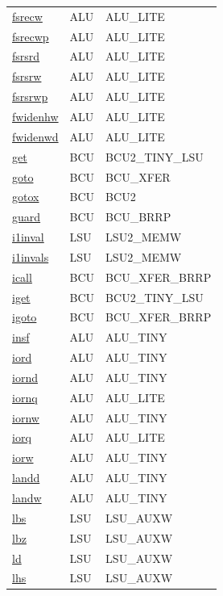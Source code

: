 \begin{small}
\begin{longtable}[l]{l l l}
\hyperlink{lvx.fsrecw}{fsrecw} & ALU & ALU\_LITE \\ 
\hyperlink{lvx.fsrecwp}{fsrecwp} & ALU & ALU\_LITE \\ 
\hyperlink{lvx.fsrsrd}{fsrsrd} & ALU & ALU\_LITE \\ 
\hyperlink{lvx.fsrsrw}{fsrsrw} & ALU & ALU\_LITE \\ 
\hyperlink{lvx.fsrsrwp}{fsrsrwp} & ALU & ALU\_LITE \\ 
\hyperlink{lvx.fwidenhw}{fwidenhw} & ALU & ALU\_LITE \\ 
\hyperlink{lvx.fwidenwd}{fwidenwd} & ALU & ALU\_LITE \\ 
\hyperlink{lvx.get}{get} & BCU & BCU2\_TINY\_LSU \\ 
\hyperlink{lvx.goto}{goto} & BCU & BCU\_XFER \\ 
\hyperlink{lvx.gotox}{gotox} & BCU & BCU2 \\ 
\hyperlink{lvx.guard}{guard} & BCU & BCU\_BRRP \\ 
\hyperlink{lvx.i1inval}{i1inval} & LSU & LSU2\_MEMW \\ 
\hyperlink{lvx.i1invals}{i1invals} & LSU & LSU2\_MEMW \\ 
\hyperlink{lvx.icall}{icall} & BCU & BCU\_XFER\_BRRP \\ 
\hyperlink{lvx.iget}{iget} & BCU & BCU2\_TINY\_LSU \\ 
\hyperlink{lvx.igoto}{igoto} & BCU & BCU\_XFER\_BRRP \\ 
\hyperlink{lvx.insf}{insf} & ALU & ALU\_TINY \\ 
\hyperlink{lvx.iord}{iord} & ALU & ALU\_TINY \\ 
\hyperlink{lvx.iornd}{iornd} & ALU & ALU\_TINY \\ 
\hyperlink{lvx.iornq}{iornq} & ALU & ALU\_LITE \\ 
\hyperlink{lvx.iornw}{iornw} & ALU & ALU\_TINY \\ 
\hyperlink{lvx.iorq}{iorq} & ALU & ALU\_LITE \\ 
\hyperlink{lvx.iorw}{iorw} & ALU & ALU\_TINY \\ 
\hyperlink{lvx.landd}{landd} & ALU & ALU\_TINY \\ 
\hyperlink{lvx.landw}{landw} & ALU & ALU\_TINY \\ 
\hyperlink{lvx.lbs}{lbs} & LSU & LSU\_AUXW \\ 
\hyperlink{lvx.lbz}{lbz} & LSU & LSU\_AUXW \\ 
\hyperlink{lvx.ld}{ld} & LSU & LSU\_AUXW \\ 
\hyperlink{lvx.lhs}{lhs} & LSU & LSU\_AUXW \\ 

\end{longtable}
\end{small}

